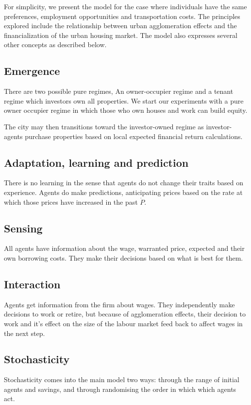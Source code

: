 For simplicity, we present the model for the case where individuals have the same preferences, employment opportunities and transportation costs. The principles explored include the relationship between urban agglomeration effects and the financialization of the urban housing market. The model also expresses several other concepts as described below.

\subsection{Emergence}
There are two possible pure regimes, An owner-occupier regime and a tenant regime which investors own all properties. We start our experiments with a pure owner occupier regime in which those who own houses and work can build equity.  

The city may then transitions toward the investor-owned regime as investor-agents purchase properties based on local expected financial return calculations.  


\subsection{Adaptation, learning and prediction}
There is no learning in the sense that agents do not change their traits based on experience. 
Agents do make predictions, anticipating prices based on the rate at which those prices have increased in the past $\dot P$.

\subsection{Sensing}
All agents have information about the wage, warranted price, expected and their own borrowing costs. They make their decisions based on what is best for them. 

\subsection{Interaction}
Agents get information from the firm about wages. They independently make decisions to work or retire, but because of agglomeration effects, their decision to work and it's effect on the size of the labour market feed back to affect wages in the next step. 

\subsection{Stochasticity}
Stochasticity comes into the main model two ways: through the range of initial agents and savings, and through randomising the order in which which agents act.

